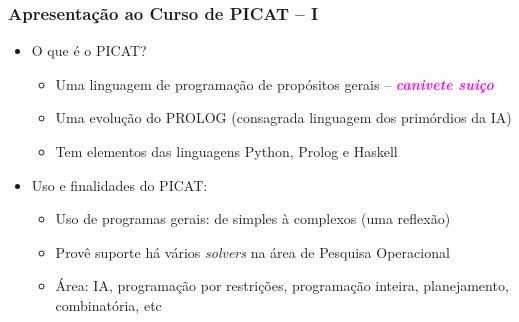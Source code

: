 \begin{frame}[fragile]

  \frametitle{Apresentação ao Curso de PICAT -- I}
  \begin{itemize}
    \item O que é o PICAT?
    \pause
       \begin{itemize}
			\item Uma linguagem de programação de propósitos gerais -- \textcolor{magenta}{\textbf{\textit{canivete suiço}}}
			\item Uma evolução do PROLOG (consagrada linguagem dos primórdios da IA)
			\item Tem elementos das linguagens Python, Prolog e Haskell
		\end{itemize}

    \item Uso e finalidades do PICAT:
    \pause
       \begin{itemize}
			\item Uso de programas gerais: de simples à complexos (uma reflexão)
			\item Provê suporte há vários \textit{solvers} na área de Pesquisa Operacional
			\item Área: IA, programação por restrições, programação inteira, planejamento,
			combinatória, etc
		\end{itemize}

   \end{itemize}

  \end{frame}
    
